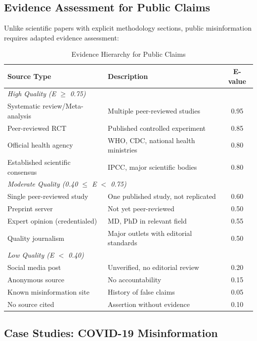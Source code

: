 \documentclass[11pt,a4paper]{article}
\begin{document}
\subsection{Evidence Assessment for Public Claims}

Unlike scientific papers with explicit methodology sections, public misinformation requires adapted evidence assessment:

\begin{table}[H]
\centering
\caption{Evidence Hierarchy for Public Claims}
\begin{tabular}{llc}
\toprule
\textbf{Source Type} & \textbf{Description} & \textbf{E-value} \\
\midrule
\multicolumn{3}{l}{\textit{High Quality (E $\geq$ 0.75)}} \\
Systematic review/Meta-analysis & Multiple peer-reviewed studies & 0.95 \\
Peer-reviewed RCT & Published controlled experiment & 0.85 \\
Official health agency & WHO, CDC, national health ministries & 0.80 \\
Established scientific consensus & IPCC, major scientific bodies & 0.80 \\
\midrule
\multicolumn{3}{l}{\textit{Moderate Quality (0.40 $\leq$ E $<$ 0.75)}} \\
Single peer-reviewed study & One published study, not replicated & 0.60 \\
Preprint server & Not yet peer-reviewed & 0.50 \\
Expert opinion (credentialed) & MD, PhD in relevant field & 0.55 \\
Quality journalism & Major outlets with editorial standards & 0.50 \\
\midrule
\multicolumn{3}{l}{\textit{Low Quality (E $<$ 0.40)}} \\
Social media post & Unverified, no editorial review & 0.20 \\
Anonymous source & No accountability & 0.15 \\
Known misinformation site & History of false claims & 0.05 \\
No source cited & Assertion without evidence & 0.10 \\
\bottomrule
\end{tabular}
\end{table}

\subsection{Case Studies: COVID-19 Misinformation}
\end{document}
